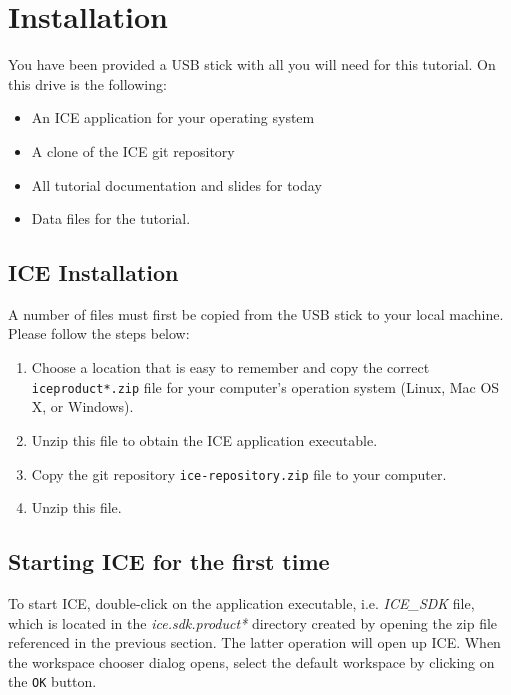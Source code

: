 \section{Installation}
You have been provided a USB stick with all you will need for this tutorial. On
this drive is the following: 
\begin{itemize}
\item An ICE application for your operating system
\item A clone of the ICE git repository
\item All tutorial documentation and slides for today
\item Data files for the tutorial. 
\end{itemize}

\subsection{ICE Installation}
A number of files must first be copied from the USB stick to your local machine. Please
follow the steps below:
\begin{enumerate}
\item Choose a location that is easy to remember
and copy the correct \texttt{ice\-product*.zip} file for your computer's 
operation system (Linux, Mac OS X, or Windows).
\item Unzip this file to obtain the 
ICE application executable.
\item Copy the git repository \texttt{ice-repository.zip} file to your computer.
\item Unzip this file.
\end{enumerate}

\subsection{Starting ICE for the first time}
To start ICE, double-click on the application executable, i.e. \textit{ICE_SDK} file, which is located in the \textit{ice.sdk.product*} directory created by opening the zip file referenced in the previous section. The latter operation will open up ICE. When the workspace chooser dialog opens, select the default workspace by clicking on the \texttt{OK} button.

